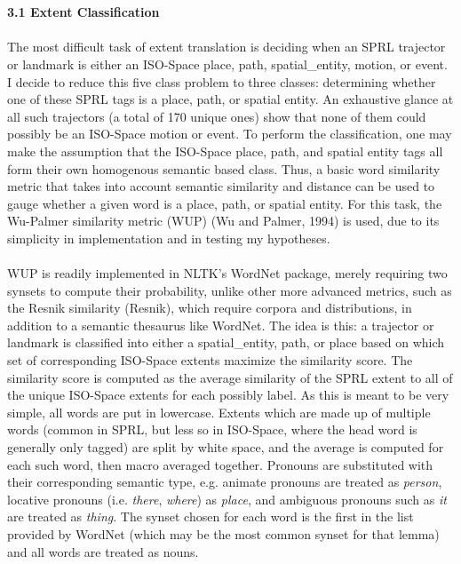 \documentclass{article}
\begin{document}
\\
\\
{\large {\bf 3.1 Extent Classification}}
\\
\\
The most difficult task of extent translation is deciding when an SPRL {\sc trajector} or {\sc landmark} is either an ISO-Space {\sc place}, {\sc path}, {\sc spatial\_entity}, {\sc motion}, or {\sc event}.  I decide to reduce this five class problem to three classes: determining whether one of these SPRL tags is a place, path, or spatial entity.  An exhaustive glance at all such {\sc trajector}s (a total of 170 unique ones) show that none of them could possibly be an ISO-Space {\sc motion} or {\sc event}.  To perform the classification, one may make the assumption that the ISO-Space place, path, and spatial entity tags all form their own homogenous semantic based class.  Thus, a basic word similarity metric that takes into account semantic similarity and distance can be used to gauge whether a given word is a place, path, or spatial entity.  For this task, the Wu-Palmer similarity metric (WUP) (Wu and Palmer, 1994) is used, due to its simplicity in implementation and in testing my hypotheses.  
\\
\\
WUP is readily implemented in NLTK's WordNet package, merely requiring two synsets to compute their probability, unlike other more advanced metrics, such as the Resnik similarity (Resnik), which require corpora and distributions, in addition to a semantic thesaurus like WordNet.  The idea is this: a {\sc trajector} or {\sc landmark} is classified into either a {\sc spatial\_entity}, {\sc path}, or {\sc place} based on which set of corresponding ISO-Space extents maximize the similarity score.  The similarity score is computed as the average similarity of the SPRL extent to all of the unique ISO-Space extents for each possibly label.  As this is meant to be very simple, all words are put in lowercase.  Extents which are made up of multiple words (common in SPRL, but less so in ISO-Space, where the head word is generally only tagged) are split by white space, and the average is computed for each such word, then macro averaged together.  Pronouns are substituted with their corresponding semantic type, e.g. animate pronouns are treated as \emph{person}, locative pronouns (i.e. \emph{there}, \emph{where}) as \emph{place}, and ambiguous pronouns such as \emph{it} are treated as \emph{thing}.  The synset chosen for each word is the first in the list provided by WordNet (which may be the most common synset for that lemma) and all words are treated as nouns.  
\end{document}
